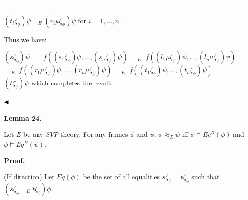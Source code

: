 \documentclass[10pt,a4paper]{amsart}
\begin{document}
 
\par\noindent  – 
 
$(t_{i}\zeta_{\phi})\psi=_{E}(r_{i}\mu\zeta_{\phi})\psi$ for $i=1,\dots,n$.\par
 
 
  
Thus we have:\par
     $\displaystyle(s\zeta_{\phi})\psi$ $\displaystyle=$ $\displaystyle f((s_{1}\zeta_{\phi})\psi,\dots,(s_{n}\zeta_{\phi})\psi)$      $\displaystyle=_{E}$ $\displaystyle f((l_{1}\mu\zeta_{\phi})\psi,\dots,(l_{n}\mu\zeta_{\phi})\psi)$      $\displaystyle=_{E}$ $\displaystyle f((r_{1}\mu\zeta_{\phi})\psi,\dots,(r_{n}\mu\zeta_{\phi})\psi)$      $\displaystyle=_{E}$ $\displaystyle f((t_{1}\zeta_{\phi})\psi,\dots,(t_{n}\zeta_{\phi})\psi)$      $\displaystyle=$ $\displaystyle(t\zeta_{\phi})\psi$     
which completes the result.\par
 
 
  
 
 
$\hfill\blacktriangleleft$\par
 
 
 
\par\medskip\noindent\textbf{Lemma 24.}\par
 
 
Let $E$ be any $\mathit{SVP}$ theory. For any frames $\phi$ and $\psi$, $\phi\approx_{E}\psi$ iff $\psi\models Eq^{B}(\phi)$ and $\phi\models Eq^{B}(\psi)$.\par
 
 
 
 
 
\par\medskip\noindent\textbf{Proof.}\par
 
 
(If direction) Let $Eq(\phi)$ be the set of all equalities $s\zeta_{\phi}=t\zeta_{\phi}$ such that $(s\zeta_{\phi}=_{E}t\zeta_{\phi})\phi$.\par
 
\end{document}
